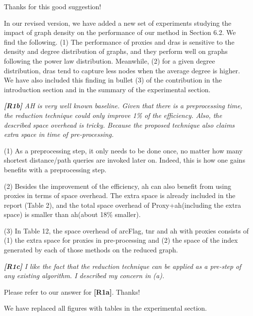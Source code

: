 \documentclass[11pt]{letter}
\newcommand{\svs}{\vspace{0.36ex}}
\newcommand{\ah}{{\sc ah}\xspace}
\newcommand{\arcflag}{{\sc arcFlag}\xspace}
\newcommand{\tnr}{{\sc tnr}\xspace}
\newcommand{\dras}{{\sc dra}s\xspace}
\begin{document}
Thanks for this good suggestion! 

In our revised version, we have added a new set of experiments studying the impact of graph density on the performance of our method in Section 6.2. 
We find the following. (1) The performance of proxies and \dras is sensitive to the density and degree distribution of graphs, and they perform well on graphs following the power law distribution. Meanwhile, (2) for a given degree distribution, \dras tend to capture less nodes when the average degree is higher.
We have also included this finding in bullet (3) of the contribution in the introduction section and in the summary of the experimental section.


\noindent
{\em
{\bf [R1b]}   AH is very well known baseline. Given that there is a preprocessing time, the reduction technique could only improve 1\% of the efficiency. Also, the described space overhead is tricky. Because the proposed technique also claims extra space in time of pre-processing.}
\svs

(1) As a preprocessing step, it only needs to be done once, no matter how many shortest distance/path queries are invoked later on. Indeed, this is how one gains benefits with a preprocessing step.

(2) Besides the improvement of the efficiency, \ah can also benefit from using proxies in terms of space overhead. The extra space is already included in the report (Table 2), and the total space overhead of Proxy+\ah (including the extra space) is smaller than \ah (about 18\% smaller).

(3) In Table 12, the space overhead of \arcflag, \tnr and \ah with proxies consists of (1) the extra space for proxies in pre-processing and (2) the space of the index generated by each of those methods on the reduced graph.



\noindent
{\em{\bf[R1c]} I like the fact that the reduction technique can be applied as a pre-step of any existing algorithm. I described my concern in (a).}
\svs

Please refer to our answer for {\bf [R1a]}. Thanks!


\svs

We have replaced all figures with tables in the experimental section.
\end{document}

